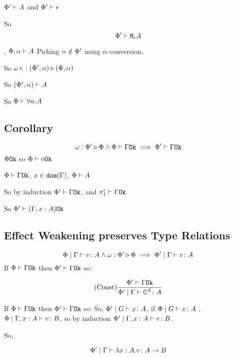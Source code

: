 {    $\Phi'\vdash A$ and $\Phi'\vdash \epsilon$

    So $$\Phi'\vdash \texttt{M}_{\epsilon}{A}$$

    \bi, $\Phi,\alpha\vdash A$
    Picking $\alpha\notin\Phi'$ using $\alpha$-conversion.

    So $\omega\times : (\Phi', \alpha) \triangleright (\Phi, \alpha)$

    So $(\Phi', \alpha)\vdash A$

    So $\Phi\vdash \forall \alpha. A$

    \subsection{Corollary}
    $$\omega : \Phi' \triangleright \Phi\wedge \Phi\vdash \Gamma \texttt{Ok} \implies \Phi'\vdash \Gamma \texttt{Ok}$$
    \bi $\Phi \texttt{Ok}$ so $\Phi\vdash \diamond \texttt{Ok}$

    \bi $\Phi\vdash \Gamma \texttt{Ok}$, $x\in\texttt{dom}(\Gamma)$, $\Phi\vdash A$

    So by induction $\Phi'\vdash \Gamma \texttt{Ok}$, and $\pi_1'\vdash \Gamma \texttt{Ok}$

    So $\Phi'\vdash (\Gamma, x: A) \texttt{Ok}$
    
    \subsection{Effect Weakening preserves Type Relations}

    \begin{equation}
        \Phi\mid\Gamma \vdash v \colon A \wedge \omega : \Phi' \triangleright \Phi \implies \Phi'\mid\Gamma \vdash v \colon A
    \end{equation}
    \proof
    If $\Phi\vdash \Gamma \texttt{Ok}$ then $\Phi'\vdash \Gamma \texttt{Ok}$ so:

    \begin{equation}
        (\text{Const}) \frac{\Phi'\vdash \Gamma \texttt{Ok}}{\Phi'\mid\Gamma \vdash \texttt{C}^{A} \colon A}
    \end{equation}

    If $\Phi\vdash \Gamma \texttt{Ok}$ then $\Phi'\vdash \Gamma \texttt{Ok}$ so:
    So, $\Phi'\mid G \vdash x \colon A$, if $\Phi\mid G \vdash x \colon A$
    \bi, $\Phi\mid\Gamma, x: A \vdash v \colon B$, so by induction $\Phi'\mid\Gamma, x: A \vdash v \colon B$.

    So,

    \begin{equation}
        \Phi'\mid\Gamma \vdash \lambda x : A. v \colon A\rightarrow B
    \end{equation}

}
